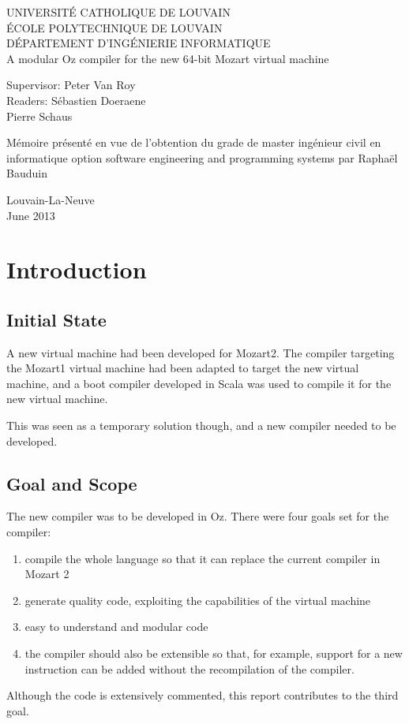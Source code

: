 \documentclass[a4paper]{memoir}
\newcommand*{\titleMS}{\begingroup%
{

\pagestyle{empty}
\centering 
{\LARGE UNIVERSITÉ CATHOLIQUE DE LOUVAIN}\\
{\LARGE ÉCOLE POLYTECHNIQUE DE LOUVAIN}\\
{\LARGE DÉPARTEMENT D'INGÉNIERIE INFORMATIQUE}\\[2\baselineskip]
\vspace{0.2\textheight}
{\LARGE A modular Oz compiler for the new 64-bit Mozart virtual machine}\par
\vspace{0.2\textheight}
\begin{minipage}[t]{0.45\textwidth}
  Supervisor: Peter Van Roy\\
  Readers: \hspace{3.9mm}S\'{e}bastien Doeraene\\
  \hspace*{18.5mm}Pierre Schaus
\end{minipage}
\hspace{3mm}
\begin{minipage}[t]{0.55\textwidth}
  M\'{e}moire pr\'{e}sent\'{e} en vue de l'obtention du grade de master ing\'{e}nieur civil en informatique option software engineering and programming systems par Raphaël Bauduin
\end{minipage}
\vspace*{2cm}
\begin{minipage}[t]{\textwidth}
\vspace*{4cm}
\centering 

Louvain-La-Neuve\\
June 2013
\end{minipage}
} %
\endgroup}
\begin{document}
\newcommand{\nav}[1]{}
\renewcommand{\topfraction}{.85}
\renewcommand{\bottomfraction}{.7}
\renewcommand{\textfraction}{.15}
\renewcommand{\floatpagefraction}{.66}
\renewcommand{\dbltopfraction}{.66}
\renewcommand{\dblfloatpagefraction}{.66}
\setcounter{topnumber}{9}
\setcounter{bottomnumber}{9}
\setcounter{totalnumber}{20}
\setcounter{dbltopnumber}{9}

\lstset{language=Oz,basicstyle=\ttfamily\small,columns=fullflexible,keepspaces=true,
escapechar=µ}

\ifdraftdoc
{}
\fi

%
\frontmatter


\begin{titlingpage}
\titleMS
\end{titlingpage}


\tableofcontents

\mainmatter
\chapter{Introduction}
\section{Initial State}
A new virtual machine had been developed for Mozart2. The compiler
targeting the Mozart1 virtual machine had been adapted to target the new
virtual machine, and a boot compiler developed in Scala was used to compile it
for the new virtual machine.

This was seen as a temporary solution though, and a new compiler needed
to be developed. 


\section{Goal and Scope}
The new compiler was to be developed in Oz.
There were four goals set for the compiler:
\begin{enumerate}
  \item compile the whole language so that it can replace the current compiler in Mozart 2
  \item generate quality code, exploiting the capabilities of the virtual machine
  \item easy to understand and modular code
  \item the compiler should also be extensible so that, for example, support for a new instruction can be added without the recompilation of the compiler.
\end{enumerate}
Although the code is extensively commented, this report contributes to the third goal.
\end{document}
